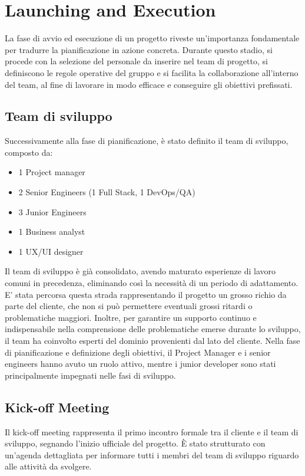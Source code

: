 \documentclass[a4paper,12pt, openright]{report}
\begin{document}
\chapter{Launching and Execution}

La fase di avvio ed esecuzione di un progetto riveste un'importanza fondamentale per tradurre la pianificazione in azione concreta. Durante questo stadio, si procede con la selezione del personale da inserire nel team di progetto, si definiscono le regole operative del gruppo e si facilita la collaborazione all'interno del team, al fine di lavorare in modo efficace e conseguire gli obiettivi prefissati.

\section{Team di sviluppo}
Successivamente alla fase di pianificazione, è stato definito il team di sviluppo, composto da:
\begin{itemize}
    \item 1 Project manager
    \item 2 Senior Engineers (1 Full Stack, 1 DevOps/QA)
    \item 3 Junior Engineers 
    \item 1 Business analyst
    \item 1 UX/UI designer
\end{itemize}

Il team di sviluppo è già consolidato, avendo maturato esperienze di lavoro comuni in precedenza, eliminando così la necessità di un periodo di adattamento. E' stata percorsa  questa strada rappresentando il progetto un grosso richio da parte del cliente, che non si può permettere eventuali grossi ritardi o problematiche maggiori. Inoltre, per garantire un supporto continuo e indispensabile nella comprensione delle problematiche emerse durante lo sviluppo, il team ha coinvolto esperti del dominio provenienti dal lato del cliente. Nella fase di pianificazione e definizione degli obiettivi, il Project Manager e i senior engineers hanno avuto un ruolo attivo, mentre i junior developer sono stati principalmente impegnati nelle fasi di sviluppo.

\section{Kick-off Meeting}

Il kick-off meeting rappresenta il primo incontro formale tra il cliente e il team di sviluppo, segnando l'inizio ufficiale del progetto. È stato strutturato con un'agenda dettagliata per informare tutti i membri del team di sviluppo riguardo alle attività da svolgere.
\end{document}

